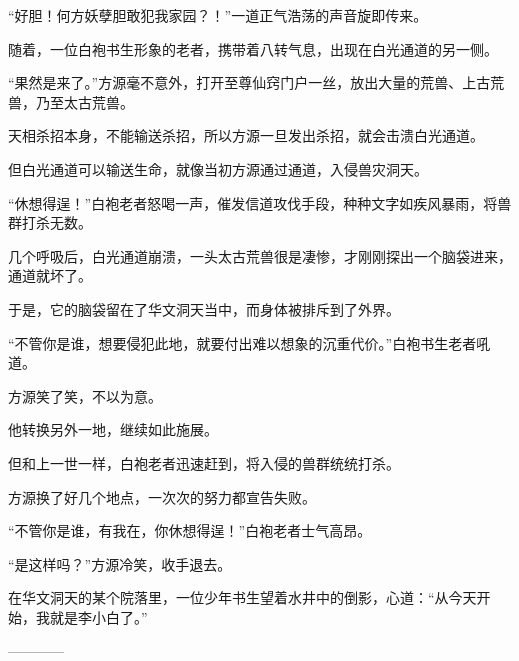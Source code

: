 \begin{this_body}
“好胆！何方妖孽胆敢犯我家园？！”一道正气浩荡的声音旋即传来。

随着，一位白袍书生形象的老者，携带着八转气息，出现在白光通道的另一侧。

“果然是来了。”方源毫不意外，打开至尊仙窍门户一丝，放出大量的荒兽、上古荒兽，乃至太古荒兽。

天相杀招本身，不能输送杀招，所以方源一旦发出杀招，就会击溃白光通道。

但白光通道可以输送生命，就像当初方源通过通道，入侵兽灾洞天。

“休想得逞！”白袍老者怒喝一声，催发信道攻伐手段，种种文字如疾风暴雨，将兽群打杀无数。

几个呼吸后，白光通道崩溃，一头太古荒兽很是凄惨，才刚刚探出一个脑袋进来，通道就坏了。

于是，它的脑袋留在了华文洞天当中，而身体被排斥到了外界。

“不管你是谁，想要侵犯此地，就要付出难以想象的沉重代价。”白袍书生老者吼道。

方源笑了笑，不以为意。

他转换另外一地，继续如此施展。

但和上一世一样，白袍老者迅速赶到，将入侵的兽群统统打杀。

方源换了好几个地点，一次次的努力都宣告失败。

“不管你是谁，有我在，你休想得逞！”白袍老者士气高昂。

“是这样吗？”方源冷笑，收手退去。

在华文洞天的某个院落里，一位少年书生望着水井中的倒影，心道：“从今天开始，我就是李小白了。”

------------

\end{this_body}

